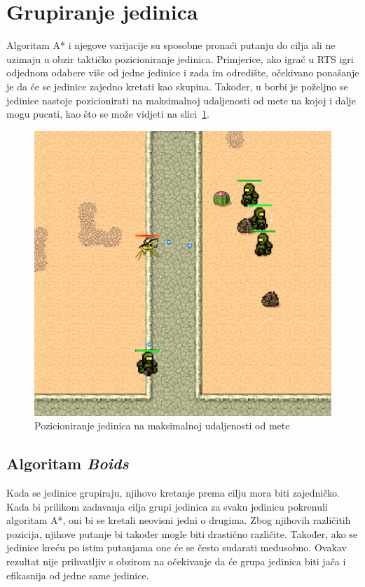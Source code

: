 \documentclass[times, utf8, zavrsni, numeric]{fer}
\begin{document}

\section{Grupiranje jedinica}\label{sec:grouping}

\par Algoritam A* i njegove varijacije su sposobne pronaći putanju do cilja ali ne uzimaju u obzir taktičko pozicioniranje jedinica. 
Primjerice, ako igrač u RTS igri odjednom odabere više od jedne jedinice i zada im odredište, očekivano ponašanje je da će se jedinice zajedno kretati kao skupina. 
Također, u borbi je poželjno se jedinice nastoje pozicionirati na maksimalnoj udaljenosti od mete na kojoj i dalje mogu pucati, kao što se može vidjeti na slici~\ref{fig:enemySeparation}.

\begin{figure}[h]
	\centering
	\includegraphics[width=0.5\linewidth]{images/enemySeparation.png}
	\caption{Pozicioniranje jedinica na maksimalnoj udaljenosti od mete}
	\label{fig:enemySeparation}
\end{figure}


\subsection{Algoritam \textit{Boids}}

\par Kada se jedinice grupiraju, njihovo kretanje prema cilju mora biti zajedničko.
Kada bi prilikom zadavanja cilja grupi jedinica za svaku jedinicu pokrenuli algoritam A*, oni bi se kretali neovisni jedni o drugima. 
Zbog njihovih različitih pozicija, njihove putanje bi također mogle biti drastično različite. 
Također, ako se jedinice kreću po istim putanjama one će se često sudarati međusobno. 
Ovakav rezultat nije prihvatljiv s obzirom na očekivanje da će grupa jedinica biti jača i efikasnija od jedne same jedinice.
\end{document}
